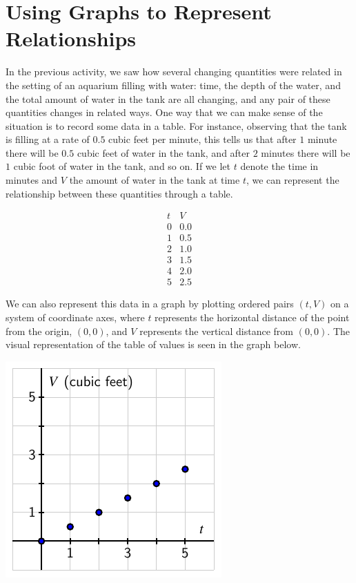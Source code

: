 \documentclass{ximera}
\begin{document}
\section{Using Graphs to Represent Relationships}
In the previous activity, we saw how several changing quantities were related in the setting of an aquarium filling with water: time, the depth of the water, and the total amount of water in the tank are all changing, and any pair of these quantities changes in related ways.  One way that we can make sense of the situation is to record some data in a table.  For instance, observing that the tank is filling at a rate of $0.5$ cubic feet per minute, this tells us that after $1$ minute there will be $0.5$ cubic feet of water in the tank, and after $2$ minutes there will be $1$ cubic foot of water in the tank, and so on.  If we let $t$ denote the time in minutes and $V$ the amount of water in the tank at time $t$, we can represent the relationship between these quantities through a table.%

$$
\begin{array}{cc}
t&V\\
\hline
0&0.0\\
1&0.5\\
2&1.0\\
3&1.5\\
4&2.0\\
5&2.5
\end{array}
$$



We can also represent this data in a graph by plotting ordered pairs $(t,V)$ on a system of coordinate axes, where $t$ represents the horizontal distance of the point from the origin, $(0,0)$, and $V$ represents the vertical distance from $(0,0)$.  The visual representation of the table of values is seen in the graph below.%

\begin{image}
\includegraphics{tandem-aquarium-V-t.pdf}
\end{image}
\end{document}
